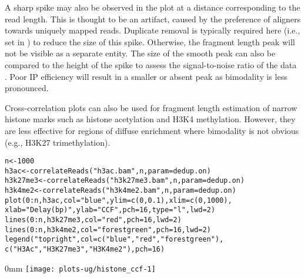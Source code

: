 \documentclass{report}\usepackage[]{graphicx}\usepackage[usenames,dvipsnames]{color}
\makeatletter
\def\maxwidth{ %
  \ifdim\Gin@nat@width>\linewidth
    \linewidth
  \else
    \Gin@nat@width
  \fi
}
\newcommand{\hlnum}[1]{\textcolor[rgb]{0.816,0.125,0.439}{#1}}%
\newcommand{\hlstr}[1]{\textcolor[rgb]{0.251,0.627,0.251}{#1}}%
\newcommand{\hlopt}[1]{\textcolor[rgb]{0,0,0}{#1}}%
\newcommand{\hlstd}[1]{\textcolor[rgb]{0.251,0.251,0.251}{#1}}%
\newcommand{\hlkwb}[1]{\textcolor[rgb]{0,0,0}{#1}}%
\newcommand{\hlkwc}[1]{\textcolor[rgb]{0.251,0.251,0.251}{#1}}%
\newcommand{\hlkwd}[1]{\textcolor[rgb]{0.878,0.439,0.125}{#1}}%
\newenvironment{knitrout}{}{} %
\makeatother
\begin{document}
A sharp spike may also be observed in the plot at a distance corresponding to the read length. 
This is thought to be an artifact, caused by the preference of aligners towards uniquely mapped reads. 
Duplicate removal is typically required here (i.e., set  in ) to reduce the size of this spike. 
Otherwise, the fragment length peak will not be visible as a separate entity.
The size of the smooth peak can also be compared to the height of the spike to assess the signal-to-noise ratio of the data \cite{landt2012}. 
Poor IP efficiency will result in a smaller or absent peak as bimodality is less pronounced. 

Cross-correlation plots can also be used for fragment length estimation of narrow histone marks such as histone acetylation and H3K4 methylation.
However, they are less effective for regions of diffuse enrichment where bimodality is not obvious (e.g., H3K27 trimethylation).

\begin{knitrout}
\color{fgcolor}\begin{kframe}
\begin{alltt}
\hlstd{n} \hlkwb{<-} \hlnum{1000}
\hlstd{h3ac} \hlkwb{<-} \hlkwd{correlateReads}\hlstd{(}\hlstr{"h3ac.bam"}\hlstd{, n,} \hlkwc{param}\hlstd{=dedup.on)}
\hlstd{h3k27me3} \hlkwb{<-} \hlkwd{correlateReads}\hlstd{(}\hlstr{"h3k27me3.bam"}\hlstd{, n,} \hlkwc{param}\hlstd{=dedup.on)}
\hlstd{h3k4me2} \hlkwb{<-} \hlkwd{correlateReads}\hlstd{(}\hlstr{"h3k4me2.bam"}\hlstd{, n,} \hlkwc{param}\hlstd{=dedup.on)}
\hlkwd{plot}\hlstd{(}\hlnum{0}\hlopt{:}\hlstd{n, h3ac,} \hlkwc{col}\hlstd{=}\hlstr{"blue"}\hlstd{,} \hlkwc{ylim}\hlstd{=}\hlkwd{c}\hlstd{(}\hlnum{0}\hlstd{,} \hlnum{0.1}\hlstd{),} \hlkwc{xlim}\hlstd{=}\hlkwd{c}\hlstd{(}\hlnum{0}\hlstd{,} \hlnum{1000}\hlstd{),}
     \hlkwc{xlab}\hlstd{=}\hlstr{"Delay (bp)"}\hlstd{,} \hlkwc{ylab}\hlstd{=}\hlstr{"CCF"}\hlstd{,} \hlkwc{pch}\hlstd{=}\hlnum{16}\hlstd{,} \hlkwc{type}\hlstd{=}\hlstr{"l"}\hlstd{,} \hlkwc{lwd}\hlstd{=}\hlnum{2}\hlstd{)}
\hlkwd{lines}\hlstd{(}\hlnum{0}\hlopt{:}\hlstd{n, h3k27me3,} \hlkwc{col}\hlstd{=}\hlstr{"red"}\hlstd{,} \hlkwc{pch}\hlstd{=}\hlnum{16}\hlstd{,} \hlkwc{lwd}\hlstd{=}\hlnum{2}\hlstd{)}
\hlkwd{lines}\hlstd{(}\hlnum{0}\hlopt{:}\hlstd{n, h3k4me2,} \hlkwc{col}\hlstd{=}\hlstr{"forestgreen"}\hlstd{,} \hlkwc{pch}\hlstd{=}\hlnum{16}\hlstd{,} \hlkwc{lwd}\hlstd{=}\hlnum{2}\hlstd{)}
\hlkwd{legend}\hlstd{(}\hlstr{"topright"}\hlstd{,} \hlkwc{col}\hlstd{=}\hlkwd{c}\hlstd{(}\hlstr{"blue"}\hlstd{,} \hlstr{"red"}\hlstd{,} \hlstr{"forestgreen"}\hlstd{),}
       \hlkwd{c}\hlstd{(}\hlstr{"H3Ac"}\hlstd{,} \hlstr{"H3K27me3"}\hlstd{,} \hlstr{"H3K4me2"}\hlstd{),} \hlkwc{pch}\hlstd{=}\hlnum{16}\hlstd{)}
\end{alltt}
\end{kframe}\begin{adjustwidth}{\fltoffset}{0mm}
\texttt{[image: plots-ug/histone\_ccf-1]} \end{adjustwidth}
\end{knitrout}
\label{data:ccf}
\end{document}
